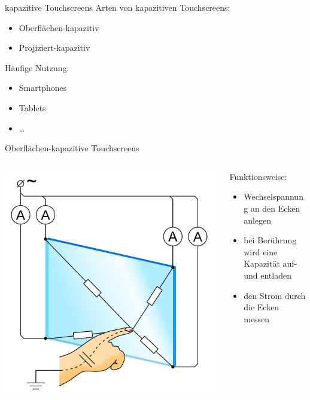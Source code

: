 \documentclass[12pt]{beamer}
\begin{document}
	\begin{frame}{kapazitive Touchscreens}
		Arten von kapazitiven Touchscreens:
		\begin{itemize}
			\item Oberflächen-kapazitiv
			\item Projiziert-kapazitiv
		\end{itemize}
		\medskip
		Häufige Nutzung:
		\begin{itemize}
			\item Smartphones
			\item Tablets
			\item \dots
		\end{itemize}
	\end{frame}

	\begin{frame}{Oberflächen-kapazitive Touchscreens}
		\begin{columns}
			\begin{column}{0.4\textwidth}
				\includegraphics[width=\textwidth]{../Images/SurfaceCapacitiveTouchScreen.png}
				
			\end{column}
			\begin{column}{0.6\textwidth}
				Funktionsweise:
				\begin{itemize}
					\item<1-> Wechselspannung an den Ecken anlegen
					\item<2-> bei Berührung wird eine Kapazität auf- und entladen
					\item<3-> den Strom durch die Ecken messen
				\end{itemize}
			\end{column}
		\end{columns}
	\end{frame}
	
\end{document}
